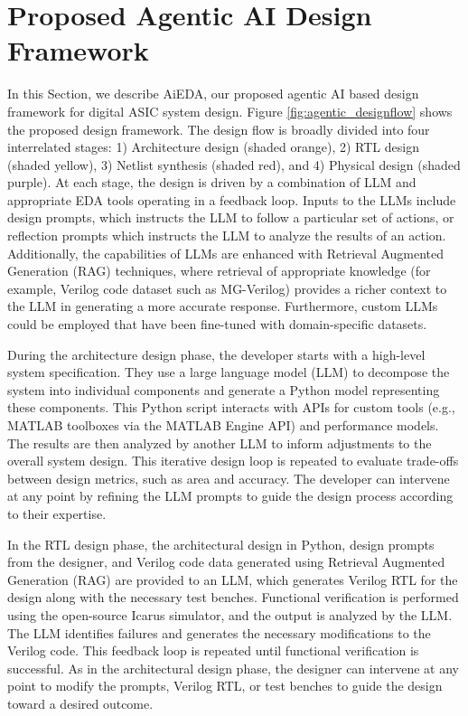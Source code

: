 \section{Proposed Agentic AI Design Framework}
\label{sec:agentic}

In this Section, we describe AiEDA, our proposed agentic AI based design framework for digital ASIC system design. Figure \ref{fig:agentic_designflow} shows the proposed design  framework. The design flow is broadly divided into four interrelated stages: 1) Architecture design (shaded orange), 2) RTL design (shaded yellow), 3) Netlist synthesis (shaded red), and 4) Physical design (shaded purple). At each stage, the design is driven by a combination of LLM and appropriate EDA tools operating in a feedback loop. Inputs to the LLMs include design prompts, which instructs the LLM to follow a particular set of actions, or reflection prompts which instructs the LLM to analyze the results of an action. Additionally, the capabilities of LLMs are enhanced with Retrieval Augmented Generation (RAG) techniques, where retrieval of appropriate knowledge (for example, Verilog code dataset such as MG-Verilog) provides a richer context to the LLM in generating a more accurate response. Furthermore, custom LLMs could be employed that have been fine-tuned with domain-specific datasets.


During the architecture design phase, the developer starts with a high-level system specification. They use a large language model (LLM) to decompose the system into individual components and generate a Python model representing these components. This Python script interacts with APIs for custom tools (e.g., MATLAB toolboxes via the MATLAB Engine API) and performance models. The results are then analyzed by another LLM to inform adjustments to the overall system design. This iterative design loop is repeated to evaluate trade-offs between design metrics, such as area and accuracy. The developer can intervene at any point by refining the LLM prompts to guide the design process according to their expertise.

In the RTL design phase, the architectural design in Python, design prompts from the designer, and Verilog code data generated using Retrieval Augmented Generation (RAG) are provided to an LLM, which generates Verilog RTL for the design along with the necessary test benches. Functional verification is performed using the open-source Icarus simulator, and the output is analyzed by the LLM. The LLM identifies failures and generates the necessary modifications to the Verilog code. This feedback loop is repeated until functional verification is successful. As in the architectural design phase, the designer can intervene at any point to modify the prompts, Verilog RTL, or test benches to guide the design toward a desired outcome.

